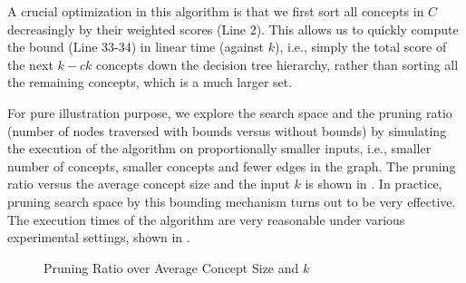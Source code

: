A crucial optimization in this algorithm is that we first sort
all concepts in $C$ decreasingly by their weighted scores (Line 2).
This allows us to quickly
compute the bound (Line 33-34) in linear time (against $k$), i.e., simply
the total score of the next $k-ck$ concepts down the decision
tree hierarchy, rather than sorting all the remaining concepts,
which is a much larger set.

For pure illustration purpose, we explore
the search space and the pruning ratio (number of nodes traversed with
bounds versus without bounds) by simulating the execution
of the algorithm on proportionally smaller inputs, i.e., smaller
number of concepts, smaller concepts and fewer edges in the graph.
The pruning ratio versus the average concept size and
the input $k$ is shown in .
In practice, pruning search space by this bounding mechanism turns
out to be very effective. The execution times of the algorithm are
very reasonable under various experimental settings,
shown in .

\begin{figure}[th]
\centering
{}
\caption{Pruning Ratio over Average Concept Size and $k$}
\label{fig:complexity}
\end{figure}


